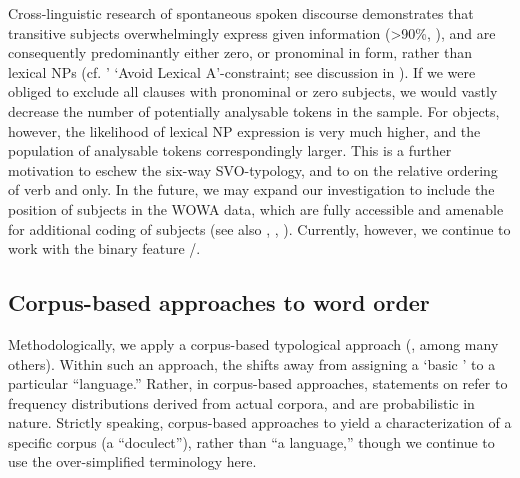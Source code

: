 \documentclass[output=paper,colorlinks,citecolor=brown,collectionchapter]{langscibook}
\begin{document}
Cross-linguistic research of spontaneous spoken discourse demonstrates that transitive subjects overwhelmingly express given information (>90\%, \citealt[165]{haig_universals_2021}), and are consequently predominantly either zero, or pronominal in form, rather than lexical NPs (cf. \citeauthor{du_bois_discourse_1987}' \citeyear{du_bois_discourse_1987} `Avoid Lexical A'-constraint; see discussion in \citealt{haig_discourse_2016}). If we were obliged to exclude all clauses with pronominal or zero subjects, we would vastly decrease the number of potentially analysable tokens in the sample. For objects, however, the likelihood of lexical NP expression is very much higher, and the population of analysable tokens correspondingly larger. This is a further motivation to eschew the six-way SVO-typology, and to  on the relative ordering of verb and  only. In the future, we may expand our investigation to include the position of subjects in the WOWA data, which are fully accessible and amenable for additional coding of subjects (see also \citealt{Molin2022NEDohok}, , ). Currently, however, we continue to work with the binary feature /.

\subsection{Corpus-based approaches to word order}\label{Intro:ss:1.4}

Methodologically, we apply a corpus-based typological approach (\citealt{walchli_data_2009,levshina_token-based_2019,futrell_dependency_2020,gerdes_typometrics_2021,haig_universals_2021,SchnellSchiborr2022Cross}, among many others). Within such an approach, the  shifts away from assigning a `basic ' to a particular ``language.'' Rather, in corpus-based approaches, statements on  refer to frequency distributions derived from actual corpora, and are probabilistic in nature. Strictly speaking, corpus-based approaches to  yield a characterization of a specific corpus (a ``doculect''), rather than ``a language,'' though we continue to use the over-simplified terminology here. 
\end{document}
